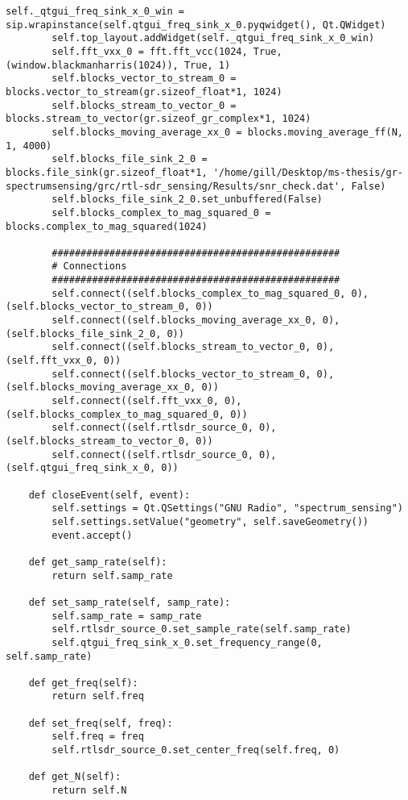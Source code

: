 \begin{lstlisting}[breaklines]
        self._qtgui_freq_sink_x_0_win = sip.wrapinstance(self.qtgui_freq_sink_x_0.pyqwidget(), Qt.QWidget)
        self.top_layout.addWidget(self._qtgui_freq_sink_x_0_win)
        self.fft_vxx_0 = fft.fft_vcc(1024, True, (window.blackmanharris(1024)), True, 1)
        self.blocks_vector_to_stream_0 = blocks.vector_to_stream(gr.sizeof_float*1, 1024)
        self.blocks_stream_to_vector_0 = blocks.stream_to_vector(gr.sizeof_gr_complex*1, 1024)
        self.blocks_moving_average_xx_0 = blocks.moving_average_ff(N, 1, 4000)
        self.blocks_file_sink_2_0 = blocks.file_sink(gr.sizeof_float*1, '/home/gill/Desktop/ms-thesis/gr-spectrumsensing/grc/rtl-sdr_sensing/Results/snr_check.dat', False)
        self.blocks_file_sink_2_0.set_unbuffered(False)
        self.blocks_complex_to_mag_squared_0 = blocks.complex_to_mag_squared(1024)

        ##################################################
        # Connections
        ##################################################
        self.connect((self.blocks_complex_to_mag_squared_0, 0), (self.blocks_vector_to_stream_0, 0))    
        self.connect((self.blocks_moving_average_xx_0, 0), (self.blocks_file_sink_2_0, 0))    
        self.connect((self.blocks_stream_to_vector_0, 0), (self.fft_vxx_0, 0))    
        self.connect((self.blocks_vector_to_stream_0, 0), (self.blocks_moving_average_xx_0, 0))    
        self.connect((self.fft_vxx_0, 0), (self.blocks_complex_to_mag_squared_0, 0))    
        self.connect((self.rtlsdr_source_0, 0), (self.blocks_stream_to_vector_0, 0))    
        self.connect((self.rtlsdr_source_0, 0), (self.qtgui_freq_sink_x_0, 0))    

    def closeEvent(self, event):
        self.settings = Qt.QSettings("GNU Radio", "spectrum_sensing")
        self.settings.setValue("geometry", self.saveGeometry())
        event.accept()

    def get_samp_rate(self):
        return self.samp_rate

    def set_samp_rate(self, samp_rate):
        self.samp_rate = samp_rate
        self.rtlsdr_source_0.set_sample_rate(self.samp_rate)
        self.qtgui_freq_sink_x_0.set_frequency_range(0, self.samp_rate)

    def get_freq(self):
        return self.freq

    def set_freq(self, freq):
        self.freq = freq
        self.rtlsdr_source_0.set_center_freq(self.freq, 0)

    def get_N(self):
        return self.N


\end{lstlisting}
